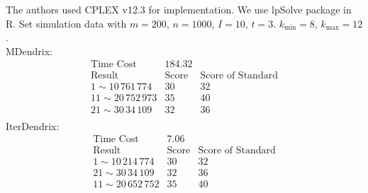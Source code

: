 \documentclass[xcolor=dvipsnames]{beamer}
\begin{document}
\begin{frame}
The authors used CPLEX v12.3 for implementation. We use lpSolve package in R. Set simulation data with $m=200$, $n=1000$, $I=10$, $t=3$. $k_{\min}=8$, $k_{\max}=12$.\\
MDendrix:\\
\begin{displaymath}
\begin{array}{ccc}
\text{Time Cost}&184.32&\\
\text{Result}&\text{Score}&\text{Score of Standard}\\
1\sim 10\,761\,774&30&32\\
11\sim 20\,752\,973&35&40\\
21\sim 30\,34\,109&32&36\\
\end{array}
\end{displaymath}
IterDendrix:\\
\begin{displaymath}
\begin{array}{ccc}
\text{Time Cost}&7.06&\\
\text{Result}&\text{Score}&\text{Score of Standard}\\
1\sim10\,214\,774&30&32\\
21\sim 30\,34\,109&32&36\\
11\sim 20\,652\,752&35&40
\end{array}
\end{displaymath}
\end{frame}
\end{document}
